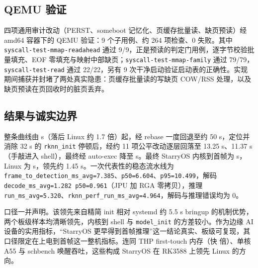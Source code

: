\subsection{QEMU 验证}

四项通用审计改动（PERST、someboot 记忆化、页缓存批量读、缺页预读）经 amd64 容器下的 QEMU 验证：9 个子用例、约 264 项检查、0 失败。其中 \texttt{syscall-test-mmap-readahead} 通过 9/9，正是预读的判定门用例，逐字节校验批量填充、EOF 零填充与映射中部缺页；\texttt{syscall-test-mmap-family} 通过 79/79，\texttt{syscall-test-read} 通过 22/22，另有 9 次干净启动验证启动表的正确性。实现期间捕获并封堵了两处真实隐患：页缓存批量读的写缺页 COW/RSS 处理，以及缺页预读在页回收时的脏页丢弃。

\subsection{结果与诚实边界}

整条曲线由 \nTtfiBefore{} s（落后 Linux 约 1.7 倍）起，经 rebase 一度回退至约 50 s，定位并消除 32 s 的 \texttt{rknn\_init} 停顿后，经约 11 项公平改动逐层回落至 13.25 s、11.37 s（手敲进入 shell），最终经 auto-exec 降至 \nTtfi s。最终 StarryOS 内核到首帧为 \nTtfi s，Linux 为 \nTtfiLin s，领先约 1.45 s。一次代表性的稳态流水线为 \texttt{frame\_to\_detection\_ms\_avg=7.385}、\texttt{p50=6.604}、\texttt{p95=10.499}，解码 \texttt{decode\_ms\_avg=1.282 p50=0.961}（JPU 加 RGA 零拷贝），推理 \texttt{run\_ms\_avg=5.320}、\texttt{rknn\_perf\_run\_ms\_avg=4.964}，解码与推理错误均为 0。

口径一并声明。该领先来自精简 init 相对 systemd 约 5.5 s bringup 的机制优势，两个板级样本均清晰领先，内核到 shell 与 \texttt{model\_init} 的方差较小。作为边缘 AI 设备的实用指标，“StarryOS 更早得到首帧推理”这一结论真实、板级可复现，其口径限定在上电到首帧这一整机指标。连同 THP first-touch 内存（快 \nThpRatio 倍）、单核 A55 与 schbench 唤醒吞吐，这些构成 StarryOS 在 RK3588 上领先 Linux 的方向。
